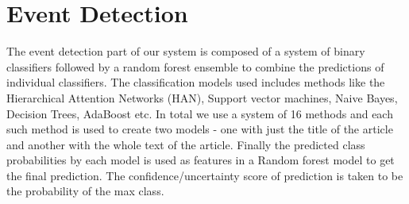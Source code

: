 \section{Event Detection}

The event detection part of our system is composed of a system of binary classifiers followed by a random forest ensemble to combine the predictions of individual classifiers. The classification models used includes methods like the Hierarchical Attention Networks (HAN), Support vector machines, Naive Bayes, Decision Trees, AdaBoost etc. In total we use a system of 16 methods and each such method is used to create two models - one with just the title of the article and another with the whole text of the article. Finally the predicted class probabilities by each model is used as features in a Random forest model to get the final prediction. The confidence/uncertainty score of prediction is taken to be the probability of the max class.
